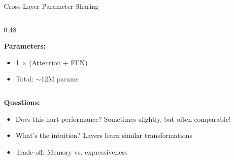 \documentclass[aspectratio=169]{beamer}
\begin{document}
\begin{frame}{Cross-Layer Parameter Sharing 🔗}
\begin{columns}[T]
\begin{column}{0.48\textwidth}
\vspace{0.5em}

\textbf{Parameters:}
\begin{itemize}\setlength{\itemsep}{0pt}
    \item 1 × (Attention + FFN)
    \item Total: $\sim$12M params
\end{itemize}
\end{column}
\end{columns}

\vspace{1em}

\textbf{Questions:}
\begin{itemize}\setlength{\itemsep}{0pt}
    \item Does this hurt performance? \alert{Sometimes slightly, but often comparable!}
    \item What's the intuition? Layers learn similar transformations
    \item Trade-off: Memory vs. expressiveness
\end{itemize}
\end{frame}
\end{document}
